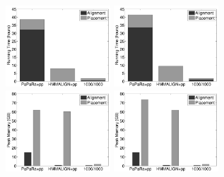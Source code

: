 \begin{figure}[htbp]
  \centering
{\label{fig:bts}\includegraphics[width=0.35\textwidth]{sepp/bio-time-sate}}
{\label{fig:btt}\includegraphics[width=0.35\textwidth]{sepp/bio-time-true}}
\\
{\label{fig:bms}\includegraphics[width=0.35\textwidth]{sepp/bio-mem-sate}}
{\label{fig:bmt}\includegraphics[width=0.35\textwidth]{sepp/bio-mem-true}}
\\

\end{figure}
